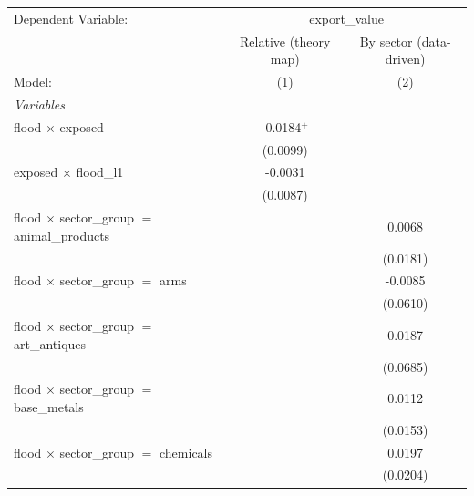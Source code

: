 
\begingroup
\centering
\begin{tabular}{lcc}
   \tabularnewline \midrule \midrule
   Dependent Variable: & \multicolumn{2}{c}{export\_value}\\
                                                                   & Relative (theory map) & By sector (data-driven) \\   
   Model:                                                          & (1)                   & (2)\\  
   \midrule
   \emph{Variables}\\
   flood $\times$ exposed                                          & -0.0184$^{+}$         &   \\   
                                                                   & (0.0099)              &   \\   
   exposed $\times$ flood\_l1                                      & -0.0031               &   \\   
                                                                   & (0.0087)              &   \\   
   flood $\times$ sector\_group $=$ animal\_products               &                       & 0.0068\\   
                                                                   &                       & (0.0181)\\   
   flood $\times$ sector\_group $=$ arms                           &                       & -0.0085\\   
                                                                   &                       & (0.0610)\\   
   flood $\times$ sector\_group $=$ art\_antiques                  &                       & 0.0187\\   
                                                                   &                       & (0.0685)\\   
   flood $\times$ sector\_group $=$ base\_metals                   &                       & 0.0112\\   
                                                                   &                       & (0.0153)\\   
   flood $\times$ sector\_group $=$ chemicals                      &                       & 0.0197\\   
                                                                   &                       & (0.0204)\\   

\end{tabular}
